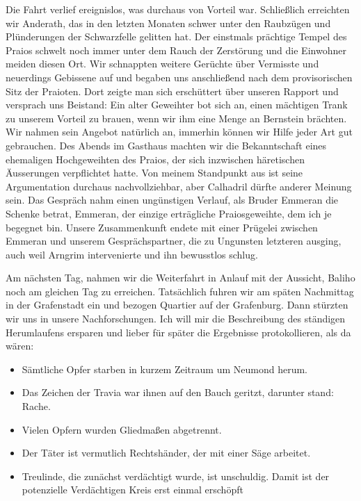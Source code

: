 \documentclass[11pt]{scrreprt}
\begin{document}
Die Fahrt verlief ereignislos, was durchaus von Vorteil war. Schließlich erreichten wir Anderath, das in den letzten Monaten schwer unter den Raubzügen und Plünderungen der Schwarzfelle gelitten hat. Der einstmals prächtige Tempel des Praios schwelt noch immer unter dem Rauch der Zerstörung und die Einwohner meiden diesen Ort. Wir schnappten weitere Gerüchte über Vermisste und neuerdings Gebissene auf und begaben uns anschließend nach dem provisorischen Sitz der Praioten. Dort zeigte man sich erschüttert über unseren Rapport und versprach uns Beistand: Ein alter Geweihter bot sich an, einen mächtigen Trank zu unserem Vorteil zu brauen, wenn wir ihm eine Menge an Bernstein brächten. Wir nahmen sein Angebot natürlich an, immerhin können wir Hilfe jeder Art gut gebrauchen. Des Abends im Gasthaus machten wir die Bekanntschaft eines ehemaligen Hochgeweihten des Praios, der sich inzwischen häretischen Äusserungen verpflichtet hatte. Von meinem Standpunkt aus ist seine Argumentation durchaus nachvollziehbar, aber Calhadril dürfte anderer Meinung sein. Das Gespräch nahm einen ungünstigen Verlauf, als Bruder Emmeran die Schenke betrat, Emmeran, der einzige erträgliche Praiosgeweihte, dem ich je begegnet bin. Unsere Zusammenkunft endete mit einer Prügelei zwischen Emmeran und unserem Gesprächspartner, die zu Ungunsten letzteren ausging, auch weil Arngrim intervenierte und ihn bewusstlos schlug.\par

Am nächsten Tag, nahmen wir die Weiterfahrt in Anlauf mit der Aussicht, Baliho noch am gleichen Tag zu erreichen. Tatsächlich fuhren wir am späten Nachmittag in der Grafenstadt ein und bezogen Quartier auf der Grafenburg. Dann stürzten wir uns in unsere Nachforschungen. Ich will mir die Beschreibung des ständigen Herumlaufens ersparen und lieber für später die Ergebnisse protokollieren, als da wären:

\begin{itemize}
\item Sämtliche Opfer starben in kurzem Zeitraum um Neumond herum.
\item Das Zeichen der Travia war ihnen auf den Bauch geritzt, darunter stand: Rache.
\item Vielen Opfern wurden Gliedmaßen abgetrennt.
\item Der Täter ist vermutlich Rechtshänder, der mit einer Säge arbeitet.
\item Treulinde, die zunächst verdächtigt wurde, ist unschuldig. Damit ist der potenzielle Verdächtigen Kreis erst einmal erschöpft
\end{itemize}
\end{document}
